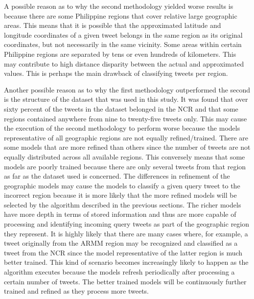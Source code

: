 A possible reason as to why the second methodology yielded worse results is because there are some Philippine regions that cover relative large geographic areas. This means that it is possible that the approximated latitude and longitude coordinates of a given tweet belongs in the same region as its original coordinates, but not necessarily in the same vicinity. Some areas within certain Philippine regions are separated by tens or even hundreds of kilometers. This may contribute to high distance disparity between the actual and approximated values. This is perhaps the main drawback of classifying tweets per region. 

Another possible reason as to why the first methodology outperformed the second is the structure of the dataset that was used in this study. It was found that over sixty percent of the tweets in the dataset belonged in the NCR and that some regions contained anywhere from nine to twenty-five tweets only. This may cause the execution of the second methodology to perform worse because the models representative of all geographic regions are not equally refined/trained. There are some models that are more refined than others since the number of tweets are not equally distributed across all available regions. This conversely means that some models are poorly trained because there are only several tweets from that region as far as the dataset used is concerned. The differences in refinement of the geographic models may cause the models to classify a given query tweet to the incorrect region because it is more likely that the more refined models will be selected by the algorithm described in the previous sections. The richer models have more depth in terms of stored information and thus are more capable of processing and identifying incoming query tweets as part of the geographic region they represent. It is highly likely that there are many cases where, for example, a tweet originally from the ARMM region may be recognized and classified as a tweet from the NCR since the model representative of the latter region is much better trained. This kind of scenario becomes increasingly likely to happen as the algorithm executes because the models refresh periodically after processing a certain number of tweets. The better trained models will be continuously further trained and refined as they process more tweets.


